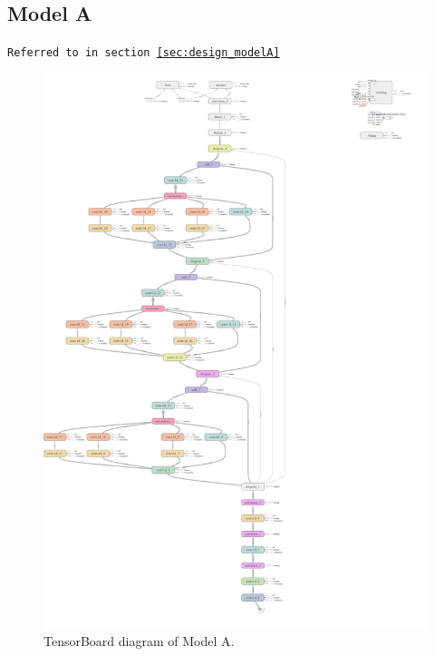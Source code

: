 \begin{appendices}
        \subsection{Model A}
        \label{app:modelA_diagram}
        \texttt{Referred to in section \ref{sec:design_modelA}}
        \begin{figure}[H]
            \centering
            \includegraphics[height=0.85\textheight]{figures/modelA_diagram.png}
            \caption*{TensorBoard diagram of Model A.}
        \end{figure}
        

\end{appendices}
